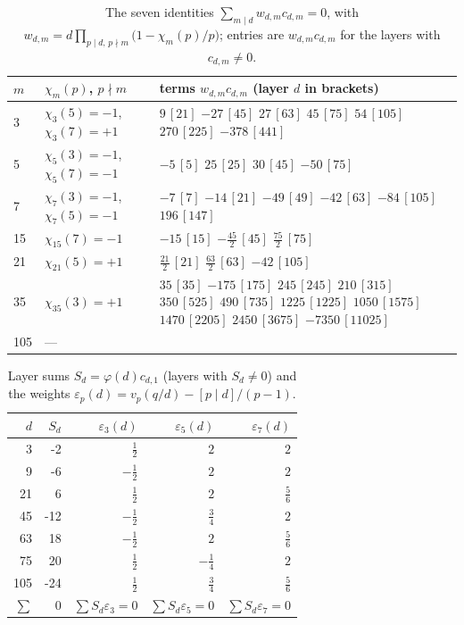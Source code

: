 \documentclass[11pt]{amsart}
\theoremstyle{definition}
\theoremstyle{remark}
\numberwithin{equation}{section}
\begin{document}
\begin{table}[ht]\centering\small
\caption{The seven identities $\sum_{m\mid d} w_{d,m}c_{d,m}=0$, with $w_{d,m}=d\prod_{p\mid d,\,p\nmid m}\bigl(1-\chi_m(p)/p\bigr)$; entries are $w_{d,m}c_{d,m}$ for the layers with $c_{d,m}\neq0$.}\label{tab:chars}
\begin{tabular}{@{}l>{\raggedright}p{}>{\raggedright\arraybackslash}p{}@{}}\toprule $m$ & $\chi_m(p)$, $p\nmid m$ & terms $w_{d,m}c_{d,m}$ (layer $d$ in brackets) \\ \midrule
3 & $\chi_{3}(5)=-1$, $\chi_{3}(7)=+1$ & $9\,[21]$ $-27\,[45]$ $27\,[63]$ $45\,[75]$ $54\,[105]$ $270\,[225]$ $-378\,[441]$ \\
5 & $\chi_{5}(3)=-1$, $\chi_{5}(7)=-1$ & $-5\,[5]$ $25\,[25]$ $30\,[45]$ $-50\,[75]$ \\
7 & $\chi_{7}(3)=-1$, $\chi_{7}(5)=-1$ & $-7\,[7]$ $-14\,[21]$ $-49\,[49]$ $-42\,[63]$ $-84\,[105]$ $196\,[147]$ \\
15 & $\chi_{15}(7)=-1$ & $-15\,[15]$ $-\tfrac{45}{2}\,[45]$ $\tfrac{75}{2}\,[75]$ \\
21 & $\chi_{21}(5)=+1$ & $\tfrac{21}{2}\,[21]$ $\tfrac{63}{2}\,[63]$ $-42\,[105]$ \\
35 & $\chi_{35}(3)=+1$ & $35\,[35]$ $-175\,[175]$ $245\,[245]$ $210\,[315]$ $350\,[525]$ $490\,[735]$ $1225\,[1225]$ $1050\,[1575]$ $1470\,[2205]$ $2450\,[3675]$ $-7350\,[11025]$ \\
105 & --- &  \\
\bottomrule\end{tabular}\end{table}

\begin{table}[ht]\centering\small
\caption{Layer sums $S_d=\varphi(d)c_{d,1}$ (layers with $S_d\ne0$) and the weights $\varepsilon_p(d)=v_p(q/d)-[p\mid d]/(p-1)$.}\label{tab:logs}
\begin{tabular}{rrrrr}\toprule $d$ & $S_d$ & $\varepsilon_3(d)$ & $\varepsilon_5(d)$ & $\varepsilon_7(d)$ \\ \midrule
3 & -2 & $\tfrac{1}{2}$ & $2$ & $2$ \\
9 & -6 & $-\tfrac{1}{2}$ & $2$ & $2$ \\
21 & 6 & $\tfrac{1}{2}$ & $2$ & $\tfrac{5}{6}$ \\
45 & -12 & $-\tfrac{1}{2}$ & $\tfrac{3}{4}$ & $2$ \\
63 & 18 & $-\tfrac{1}{2}$ & $2$ & $\tfrac{5}{6}$ \\
75 & 20 & $\tfrac{1}{2}$ & $-\tfrac{1}{4}$ & $2$ \\
105 & -24 & $\tfrac{1}{2}$ & $\tfrac{3}{4}$ & $\tfrac{5}{6}$ \\
\midrule $\sum$ & 0 & $\sum S_d\varepsilon_3=0$ & $\sum S_d\varepsilon_5=0$ & $\sum S_d\varepsilon_7=0$ \\
\bottomrule\end{tabular}\end{table}
\end{document}
